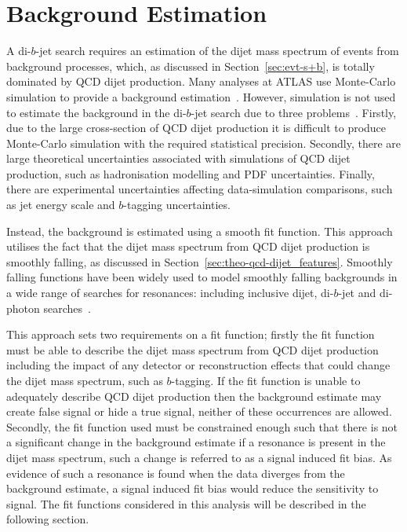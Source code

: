 

\section{Background Estimation}
\label{sec:bkg-fit}

A di-$b$-jet search requires an estimation of the dijet mass spectrum of events from background processes,
which, as discussed in Section~\ref{sec:evt-s+b}, is totally dominated by QCD dijet production.
Many analyses at ATLAS use Monte-Carlo simulation
to provide a background estimation~\cite{obj-Hbb}.
However, simulation is not used to estimate the
background in the di-$b$-jet search due to three problems~\cite{theo-dijet_harris}.
Firstly, due to the large cross-section of QCD dijet production it is difficult to produce Monte-Carlo simulation with the required statistical precision.
Secondly, there are large theoretical uncertainties associated with simulations of QCD dijet production,
such as hadronisation modelling and PDF uncertainties.
Finally, there are experimental uncertainties affecting
data-simulation comparisons, such as jet energy scale and $b$-tagging uncertainties.

Instead, the background is estimated using a smooth fit function.
This approach utilises the fact that the dijet mass spectrum
from QCD dijet production is smoothly falling,
as discussed in Section~\ref{sec:theo-qcd-dijet_features}.
Smoothly falling functions have been widely used to model smoothly falling backgrounds in a wide range of searches for resonances:
including inclusive dijet, di-$b$-jet and di-photon searches~\cite{dijet-mori16_paper,dibjet-mori16_paper,bkg-higgs_gammagamma}.

This approach sets two requirements on a fit function;
firstly the fit function must be able to describe the dijet mass spectrum from QCD dijet production
including the impact of any detector or reconstruction effects that could change the dijet mass spectrum, such as $b$-tagging.
If the fit function is unable to adequately describe QCD dijet production then the background estimate may
create false signal or hide a true signal, neither of these occurrences are allowed.
Secondly, the fit function used must be constrained enough such that there is not a
significant change in the background estimate if a resonance is present in the dijet mass spectrum,
such a change is referred to as a signal induced fit bias.
As evidence of such a resonance is found when the data diverges from the background estimate,
a signal induced fit bias would reduce the sensitivity to signal.
The fit functions considered in this analysis will be described in the following section.

